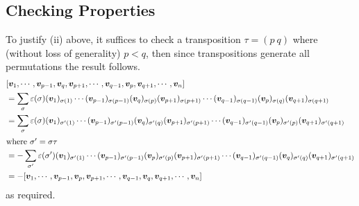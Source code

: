 \documentclass{article}
\begin{document}
	\subsection{Checking Properties}
	To justify (ii) above, it suffices to check a transposition $\tau = (p\ q)$ where (without loss of generality) $p < q$, then since transpositions generate all permutations the result follows.
	\begin{align*}
		&[\bm v_1, \cdots, \bm v_{p-1}, \bm v_q, \bm v_{p+1}, \cdots, \bm v_{q-1}, \bm v_p, \bm v_{q+1}, \cdots, \bm v_n] \\
		&= \sum_\sigma \varepsilon(\sigma) (\bm v_1)_{\sigma(1)} \cdots (\bm v_{p-1})_{\sigma(p-1)}(\bm v_q)_{\sigma(p)}(\bm v_{p+1})_{\sigma(p+1)} \cdots (\bm v_{q-1})_{\sigma(q-1)}(\bm v_p)_{\sigma(q)}(\bm v_{q+1})_{\sigma(q+1)} \\
		&= \sum_\sigma \varepsilon(\sigma) (\bm v_1)_{\sigma'(1)} \cdots (\bm v_{p-1})_{\sigma'(p-1)}(\bm v_q)_{\sigma'(q)}(\bm v_{p+1})_{\sigma'(p+1)} \cdots (\bm v_{q-1})_{\sigma'(q-1)}(\bm v_p)_{\sigma'(p)}(\bm v_{q+1})_{\sigma'(q+1)} \\
		\intertext{where $\sigma' = \sigma\tau$}
		&= -\sum_{\sigma'} \varepsilon(\sigma') (\bm v_1)_{\sigma'(1)} \cdots (\bm v_{p-1})_{\sigma'(p-1)}(\bm v_p)_{\sigma'(p)}(\bm v_{p+1})_{\sigma'(p+1)} \cdots (\bm v_{q-1})_{\sigma'(q-1)}(\bm v_q)_{\sigma'(q)}(\bm v_{q+1})_{\sigma'(q+1)} \\
		&= -[\bm v_1, \cdots, \bm v_{p-1}, \bm v_p, \bm v_{p+1}, \cdots, \bm v_{q-1}, \bm v_q, \bm v_{q+1}, \cdots, \bm v_n]
	\end{align*}
	as required.
\end{document}

